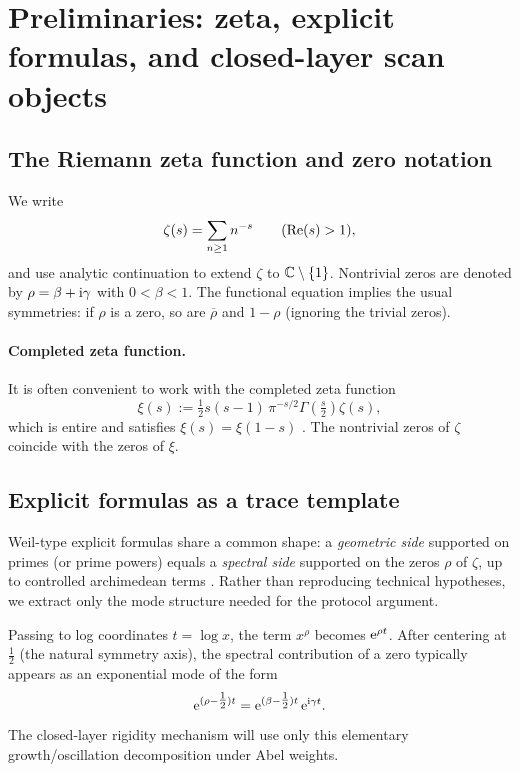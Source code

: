 
\section{Preliminaries: zeta, explicit formulas, and closed-layer scan objects}
\label{sec:preliminaries}

\subsection{The Riemann zeta function and zero notation}
\label{sec:zeta_notation}

We write
\[
\zeta(s)=\sum_{n\ge 1} n^{-s}\qquad (\operatorname{Re}(s)>1),
\]
and use analytic continuation to extend $\zeta$ to $\mathbb{C}\setminus\{1\}$.
Nontrivial zeros are denoted by $\rho=\beta+\mathrm{i}\gamma$ with $0<\beta<1$.
The functional equation implies the usual symmetries: if $\rho$ is a zero, so are $\overline{\rho}$ and $1-\rho$ (ignoring the trivial zeros).

\paragraph{Completed zeta function.}
It is often convenient to work with the completed zeta function
\[
\xi(s):=\tfrac12 s(s-1)\,\pi^{-s/2}\Gamma\!\left(\tfrac{s}{2}\right)\zeta(s),
\]
which is entire and satisfies $\xi(s)=\xi(1-s)$ \cite{Titchmarsh1986,Edwards1974}.
The nontrivial zeros of $\zeta$ coincide with the zeros of $\xi$.

\subsection{Explicit formulas as a trace template}
\label{sec:explicit_formula_template}

Weil-type explicit formulas share a common shape: a \emph{geometric side} supported on primes (or prime powers) equals a \emph{spectral side} supported on the zeros $\rho$ of $\zeta$, up to controlled archimedean terms \cite{IwaniecKowalski2004, Titchmarsh1986}.
Rather than reproducing technical hypotheses, we extract only the mode structure needed for the protocol argument.

Passing to log coordinates $t=\log x$, the term $x^\rho$ becomes $\mathrm{e}^{\rho t}$.
After centering at $\tfrac{1}{2}$ (the natural symmetry axis), the spectral contribution of a zero typically appears as an exponential mode of the form
\[
\mathrm{e}^{(\rho-\tfrac{1}{2})t}=\mathrm{e}^{(\beta-\tfrac{1}{2})t}\,\mathrm{e}^{\mathrm{i}\gamma t}.
\]
The closed-layer rigidity mechanism will use only this elementary growth/oscillation decomposition under Abel weights.

